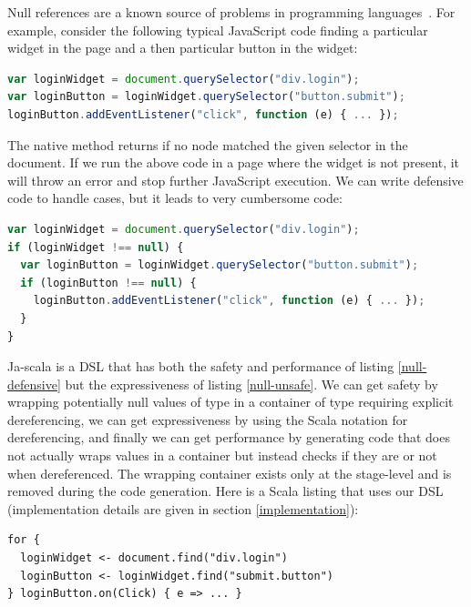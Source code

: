 \documentclass[runningheads,a4paper]{llncs}
\begin{document}
Null references are a known source of problems in programming languages~\cite{Hoare09_Null,Nanda09_Null}. For
example, consider the following typical JavaScript code finding a particular widget in the page and a then particular
button in the widget:

\begin{lstlisting}[language=JavaScript,label=null-unsafe,caption=Unsafe code]
var loginWidget = document.querySelector("div.login");
var loginButton = loginWidget.querySelector("button.submit");
loginButton.addEventListener("click", function (e) { ... });
\end{lstlisting}

The native  method returns  if no node matched the given selector in the document. If
we run the above code in a page where the widget is not present, it will throw an error and stop further JavaScript
execution. We can write defensive code to handle  cases, but it leads to very cumbersome code:

\begin{lstlisting}[language=JavaScript,label=null-defensive,caption=Defensive programming to handle null references]
var loginWidget = document.querySelector("div.login");
if (loginWidget !== null) {
  var loginButton = loginWidget.querySelector("button.submit");
  if (loginButton !== null) {
    loginButton.addEventListener("click", function (e) { ... });
  }
}
\end{lstlisting}

Ja-scala is a DSL that has both the safety and performance of listing \ref{null-defensive} but the
expressiveness of listing \ref{null-unsafe}. We can get safety by wrapping potentially null values of type
 in a container of type  requiring explicit dereferencing, we can get
expressiveness by using the Scala  notation for dereferencing, and finally we can get performance by
generating code that does not actually wraps values in a container but instead checks if they are  or not
when dereferenced. The wrapping container exists only at the stage-level and is removed during the code generation.
Here is a Scala listing that uses our DSL (implementation details are given in section \ref{implementation}):

\begin{lstlisting}
for {
  loginWidget <- document.find("div.login")
  loginButton <- loginWidget.find("submit.button")
} loginButton.on(Click) { e => ... }
\end{lstlisting}
\end{document}
